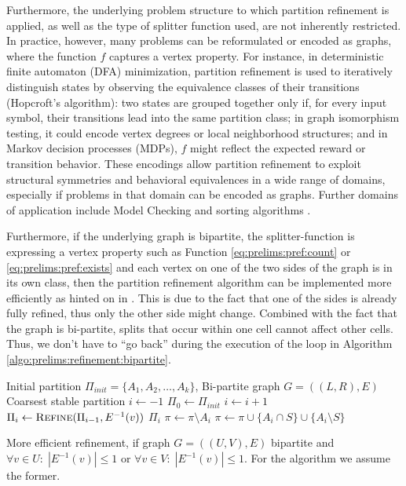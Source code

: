 		Furthermore, the underlying problem structure to which partition refinement is applied, as well as the type of splitter function used, are not inherently restricted. In practice, however, many problems can be reformulated or encoded as graphs, where the function $f$ captures a vertex property. 
		For instance, in deterministic finite automaton (DFA) minimization, partition refinement is used to iteratively distinguish states by observing the equivalence classes of their transitions (Hopcroft's algorithm): two states are grouped together only if, for every input symbol, their transitions lead into the same partition class; in graph isomorphism testing, it could encode vertex degrees or local neighborhood structures; and in Markov decision processes (MDPs), $f$ might reflect the expected reward or transition behavior.
		These encodings allow partition refinement to exploit structural symmetries and behavioral equivalences in a wide range of domains, especially if problems in that domain can be encoded as graphs. 
		Further domains of application include Model Checking \cite{baierPrinciplesModelChecking2008} and sorting algorithms \cite{mehlhornAlgorithmsDataStructures2008}.
	
		Furthermore, if the underlying graph is bipartite, the splitter-function is expressing a vertex property such as Function \ref{eq:prelims:pref:count} or \ref{eq:prelims:pref:exists} and each vertex on one of the two sides of the graph is in its own class, then the partition refinement algorithm can be implemented more efficiently as hinted on in \cite{salvagninDetectingSemanticGroups2016}.
		This is due to the fact that one of the sides is already fully refined, thus only the other side might change. Combined with the fact that the graph is bi-partite, splits that occur within one cell cannot affect other cells.
		Thus, we don't have to \enquote{go back} during the execution of the loop in Algorithm \ref{algo:prelims:refinement:bipartite}.
		
		\begin{algorithm}[ht!]
			\centering
			\begin{algorithmic}
				\Require Initial partition $\Pi_{init} = \{ A_1, A_2, \ldots, A_k \}$, Bi-partite graph $G = ((L, R), E)$
				\Ensure Coarsest stable partition
				\Statex
					\State $i \gets -1$
					\State $\Pi_0 \gets \Pi_{init}$
						\State $i \gets i + 1$
						\State $\Pi_{i} \gets \Call{Refine}{\Pi_{i-1}, E^{-1}(v)}$
					\EndFor
					\State \Return $\Pi_i$
				\EndFunction
				\Statex
						\State $\pi \gets \pi \setminus A_i$
						\State $\pi \gets \pi \cup \{ A_i \cap S \} \cup \{ A_i \setminus S \}$ 
					\EndFor
				\EndFunction
			\end{algorithmic}
			\caption{More efficient refinement, if graph $G=((U, V), E)$ bipartite and $\forall v \in U:\; |E^{-1}(v)| \leq 1$ or $\forall v \in V:\; |E^{-1}(v)| \leq 1$. For the algorithm we assume the former.}
			\label{algo:prelims:refinement:bipartite}
		\end{algorithm}
	

